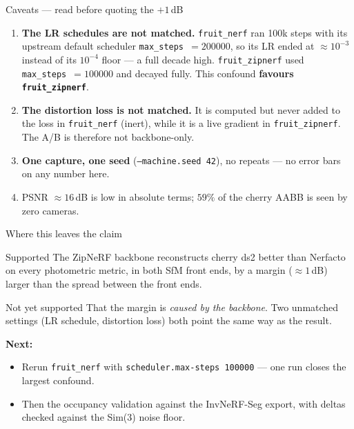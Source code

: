 \documentclass[aspectratio=169,11pt]{beamer}
\newcommand{\zn}{\textcolor{zipblue}{\texttt{fruit\_zipnerf}}}
\newcommand{\fn}{\textcolor{fnorange}{\texttt{fruit\_nerf}}}
\begin{document}
\begin{frame}{Caveats --- read before quoting the $+1$\,dB}
  \begin{enumerate}
    \item \textbf{The LR schedules are not matched.} \fn{} ran 100k steps with
          its upstream default scheduler \texttt{max\_steps}~$=200000$, so its
          LR ended at $\approx 10^{-3}$ instead of its $10^{-4}$ floor --- a
          full decade high. \zn{} used \texttt{max\_steps}~$=100000$ and decayed
          fully. This confound \textbf{favours \zn}.
    \item \textbf{The distortion loss is not matched.} It is computed but never
          added to the loss in \texttt{fruit\_nerf} (inert), while it is a live
          gradient in \texttt{fruit\_zipnerf}. The A/B is therefore not
          backbone-only.
    \item \textbf{One capture, one seed} (\texttt{--machine.seed 42}), no
          repeats --- no error bars on any number here.
    \item PSNR $\approx 16$\,dB is low in absolute terms; $59\%$ of the cherry
          AABB is seen by zero cameras.
  \end{enumerate}
\end{frame}

\begin{frame}{Where this leaves the claim}
  \begin{block}{Supported}
    The ZipNeRF backbone reconstructs cherry ds2 better than Nerfacto on every
    photometric metric, in both SfM front ends, by a margin ($\approx 1$\,dB)
    larger than the spread between the front ends.
  \end{block}

  \begin{block}{Not yet supported}
    That the margin is \emph{caused by the backbone}. Two unmatched settings
    (LR schedule, distortion loss) both point the same way as the result.
  \end{block}

  \vspace{0.5em}
  \textbf{Next:}
  \begin{itemize}
    \item Rerun \fn{} with \texttt{scheduler.max-steps 100000} --- one run
          closes the largest confound.
    \item Then the occupancy validation against the InvNeRF-Seg export, with
          deltas checked against the Sim(3) noise floor.
  \end{itemize}
\end{frame}
\end{document}
